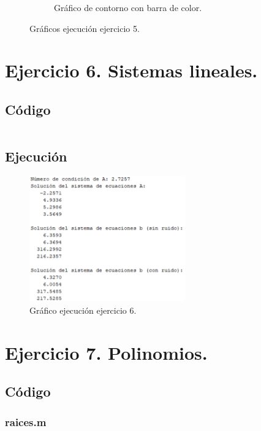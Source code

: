\documentclass[a4paper, 12pt]{article}
\begin{document}
\begin{figure}[ht]
\begin{subfigure}{0.49\textwidth}
			\caption{Gráfico de contorno con barra de color.}
			\label{grafica5.3}
		\end{subfigure}
		\caption{Gráficos ejecución ejercicio 5.}
		\label{graficos5}
	\end{figure}
	
	\section{Ejercicio 6. Sistemas lineales.}
	
	\subsection{Código}
	\inputminted[fontsize=\scriptsize, linenos, breaklines=true, xleftmargin=0.75cm, frame=lines]{matlab}{code/Ejercicio6.m}
	\subsection{Ejecución}
	\begin{figure}[htp!]
		\centering
		\includegraphics[width=0.6\textwidth]{figures/ejc6.png}
		\caption{Gráfico ejecución ejercicio 6.}
	\end{figure}
	
	\section{Ejercicio 7. Polinomios.}
	
	\subsection{Código}
	\subsubsection*{raices.m}
	\inputminted[fontsize=\scriptsize, linenos, breaklines=true, xleftmargin=0.75cm, frame=lines]{matlab}{code/raices.m}
	\inputminted[fontsize=\scriptsize, linenos, breaklines=true, xleftmargin=0.75cm, frame=lines]{matlab}{code/Ejercicio7.m}
\end{document}
